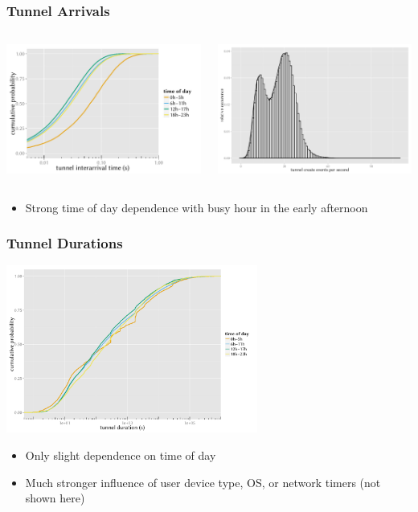 \documentclass{beamer}
\begin{document}
\begin{frame}
	\frametitle{Tunnel Arrivals}
	\begin{columns}[c]
		\begin{column}{6.5cm}
				\includegraphics[width=6.5cm]{../../chapters/04-mobilenets/images/R-IAT-fromflows-ecdfs-2h.pdf}
		\end{column}
		\begin{column}{6.5cm}
			\includegraphics[width=6.5cm]{../../chapters/04-mobilenets/images/R-create-frequency.pdf}
		\end{column}
	\end{columns}

	\begin{itemize}
		\item Strong time of day dependence with busy hour in the early afternoon
	\end{itemize}
\end{frame}

\begin{frame}
	\frametitle{Tunnel Durations}
	\begin{center}
		\includegraphics[height=5.5cm]{../../chapters/04-mobilenets/images/R-duration-timeofday-ecdf.pdf}
	\end{center}

	\begin{itemize}
		\item Only slight dependence on time of day
		\item Much stronger influence of user device type, OS, or network timers (not shown here)
	\end{itemize}
\end{frame}
\end{document}
